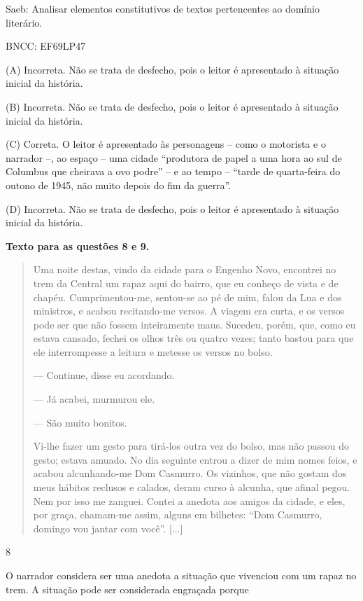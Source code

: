 Saeb: Analisar elementos constitutivos de textos pertencentes ao domínio
literário.

BNCC: EF69LP47

(A) Incorreta. Não se trata de desfecho, pois o leitor é apresentado à
situação inicial da história.

(B) Incorreta. Não se trata de desfecho, pois o leitor é apresentado à
situação inicial da história.

(C) Correta. O leitor é apresentado às personagens -- como o motorista e
o narrador --, ao espaço -- uma cidade ``produtora de papel a uma hora
ao sul de Columbus que cheirava a ovo podre'' -- e ao tempo -- ``tarde
de quarta-feira do outono de 1945, não muito depois do fim da guerra''.

(D) Incorreta. Não se trata de desfecho, pois o leitor é apresentado à
situação inicial da história.

\textbf{Texto para as questões 8 e 9.}

\begin{quote}
Uma noite destas, vindo da cidade para o Engenho Novo, encontrei no trem
da Central um rapaz aqui do bairro, que eu conheço de vista e de chapéu.
Cumprimentou-me, sentou-se ao pé de mim, falou da Lua e dos ministros, e
acabou recitando-me versos. A viagem era curta, e os versos pode ser que
não fossem inteiramente maus. Sucedeu, porém, que, como eu estava
cansado, fechei os olhos três ou quatro vezes; tanto bastou para que ele
interrompesse a leitura e metesse os versos no bolso.

--- Continue, disse eu acordando.

--- Já acabei, murmurou ele.

--- São muito bonitos.

Vi-lhe fazer um gesto para tirá-los outra vez do bolso, mas não passou
do gesto; estava amuado. No dia seguinte entrou a dizer de mim nomes
feios, e acabou alcunhando-me Dom Casmurro. Os vizinhos, que não gostam
dos meus hábitos reclusos e calados, deram curso à alcunha, que afinal
pegou. Nem por isso me zanguei. Contei a anedota aos amigos da cidade, e
eles, por graça, chamam-me assim, alguns em bilhetes: ``Dom Casmurro,
domingo vou jantar com você''. {[}...{]}
\end{quote}


\num{8}

O narrador considera ser uma anedota a situação que vivenciou com um
rapaz no trem. A situação pode ser considerada engraçada porque

